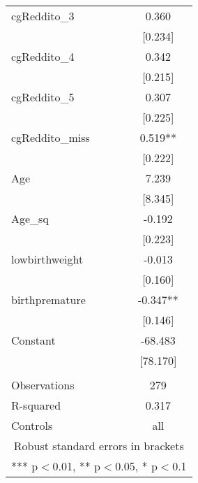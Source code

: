 \documentclass[]{article}
\begin{document}
\begin{tabular}{lc}
cgReddito\_3 & 0.360 \\
 & [0.234] \\
cgReddito\_4 & 0.342 \\
 & [0.215] \\
cgReddito\_5 & 0.307 \\
 & [0.225] \\
cgReddito\_miss & 0.519** \\
 & [0.222] \\
Age & 7.239 \\
 & [8.345] \\
Age\_sq & -0.192 \\
 & [0.223] \\
lowbirthweight & -0.013 \\
 & [0.160] \\
birthpremature & -0.347** \\
 & [0.146] \\
Constant & -68.483 \\
 & [78.170] \\
 &  \\
Observations & 279 \\
R-squared & 0.317 \\
 Controls & all \\ \hline
\multicolumn{2}{c}{ Robust standard errors in brackets} \\
\multicolumn{2}{c}{ *** p$<$0.01, ** p$<$0.05, * p$<$0.1} \\
\end{tabular}
\end{document}
